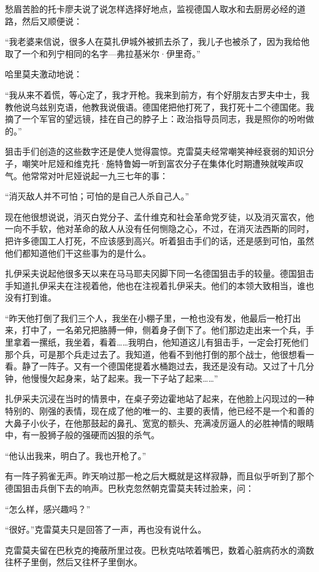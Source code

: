 愁眉苦脸的托卡廖夫说了说怎样选择好地点，监视德国人取水和去厨房必经的道路，然后又顺便说：

“我老婆来信说，很多人在莫扎伊城外被抓去杀了，我儿子也被杀了，因为我给他取了一个和列宁相同的名字—弗拉基米尔·伊里奇。”

哈里莫夫激动地说：

“我从来不着慌，等心定了，我才开枪。我来到前方，有个好朋友古罗夫中士，我教他说乌兹别克语，他教我说俄语。德国佬把他打死了，我打死十二个德国佬。我摘了一个军官的望远镜，挂在自己的脖子上：政治指导员同志，我是照你的吩咐做的。”

狙击手们创造的这些数字还是使人觉得震惊。克雷莫夫经常嘲笑神经衰弱的知识分子，嘲笑叶尼娅和维克托·施特鲁姆一听到富农分子在集体化时期遭殃就唉声叹气。他常常对叶尼娅说起一九三七年的事：

“消灭敌人并不可怕；可怕的是自己人杀自己人。”

现在他很想说说，消灭白党分子、孟什维克和社会革命党歹徒，以及消灭富农，他一向不手软，他对革命的敌人从没有任何恻隐之心，不过，在消灭法西斯的同时，把许多德国工人打死，不应该感到高兴。听着狙击手们的话，还是感到可怕，虽然他们都知道他们干这些事为的是什么。

扎伊采夫说起他很多天以来在马马耶夫冈脚下同一名德国狙击手的较量。德国狙击手知道扎伊采夫在注视着他，他也在注视着扎伊采夫。他们的本领大致相当，谁也没有打到谁。

“昨天他打倒了我们三个人，我坐在小棚子里，一枪也没有发，他最后一枪打出来，打中了，一名弟兄把胳膊一伸，侧着身子倒下了。他们那边走出来一个兵，手里拿着一摞纸，我坐着，看着……我明白，他知道这儿有狙击手，一定会打死他们那个兵，可是那个兵走过去了。我知道，他看不到他打倒的那个战士，他很想看一看。静了一阵子。又有一个德国佬提着水桶跑过去，我还是没有动。又过了十几分钟，他慢慢欠起身来，站了起来。我一下子站了起来……”

扎伊采夫沉浸在当时的情景中，在桌子旁边霍地站了起来，在他脸上闪现过的一种特别的、刚强的表情，现在成了他的唯一的、主要的表情，他已经不是一个和善的大鼻子小伙子，在他那鼓起的鼻孔、宽宽的额头、充满凌厉逼人的必胜神情的眼睛中，有一股狮子般的强硬而凶狠的杀气。

“他认出我来，明白了。我也开枪了。”

有一阵子鸦雀无声。昨天响过那一枪之后大概就是这样寂静，而且似乎听到了那个德国狙击兵倒下去的响声。巴秋克忽然朝克雷莫夫转过脸来，问：

“怎么样，感兴趣吗？”

“很好。”克雷莫夫只是回答了一声，再也没有说什么。

克雷莫夫留在巴秋克的掩蔽所里过夜。巴秋克咕哝着嘴巴，数着心脏病药水的滴数往杯子里倒，然后又往杯子里倒水。

